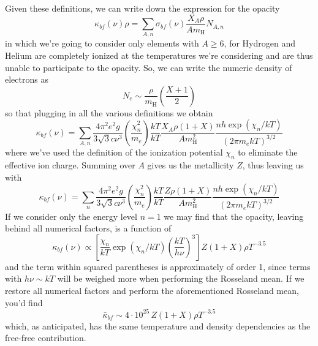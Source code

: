 Given these definitions, we can write down the expression for the opacity
\begin{equation*}
	\kappa_{bf}(\nu)\rho = \sum_{A,n}\sigma_{bf}(\nu)\frac{X_{A}\rho}{A m_{\text{H}}}N_{A,n}
\end{equation*}
in which we're going to consider only elements with $A\geq 6$, for Hydrogen and Helium are completely ionized at the temperatures we're considering and are thus unable to participate to the opacity. So, we can write the numeric density of electrons as
\begin{equation*}
	N_{e}\sim \frac{\rho}{m_{\text{H}}} \left(\frac{X+1}{2}\right)
\end{equation*}
so that plugging in all the various definitions we obtain
\begin{equation*}
	\kappa_{bf}(\nu) = \sum_{A,n} \frac{4\pi^{2}e^{2}g}{3\sqrt{3}c\nu^{3}}\left(\frac{\chi_{n}^{2}}{m_{e}}\right)\frac{kT}{kT}\frac{X_{A}\rho(1+X)}{Am_{\text{H}}^{2}}\frac{nh\exp(\chi_{n}/kT)}{(2\pi m_{e}kT)^{3/2}}
\end{equation*}
where we've used the definition of the ionization potential $\chi_{n}$ to eliminate the effective ion charge. Summing over $A$ gives us the metallicity $Z$, thus leaving us with 
\begin{equation*}
	\kappa_{bf}(\nu) = \sum_{n} \frac{4\pi^{2}e^{2}g}{3\sqrt{3}c\nu^{3}}\left(\frac{\chi_{n}^{2}}{m_{e}}\right)\frac{kT}{kT}\frac{Z\rho(1+X)}{Am_{\text{H}}^{2}}\frac{nh\exp(\chi_{n}/kT)}{(2\pi m_{e}kT)^{3/2}}
\end{equation*}
If we consider only the energy level $n=1$ we may find that the opacity, leaving behind all numerical factors, is a function of 
\begin{equation*}
	\kappa_{bf}(\nu) \propto \left[\frac{\chi_{n}}{kT}\exp\left(\chi_{n}/kT\right)\left(\frac{kT}{h\nu}\right)^{3}\right]Z(1+X)\rho T^{-3.5}
\end{equation*}
and the term within squared parentheses is approximately of order 1, since terms with $h\nu\sim kT$ will be weighed more when performing the Rosseland mean. If we restore all numerical factors and perform the aforementioned Rosseland mean, you'd find 
\begin{equation}
	\bar{\kappa}_{bf} \sim 4\cdot 10^{25}\,Z(1+X)\rho T^{-3.5}
	\label{eq:photoionizationopacity}
\end{equation}
which, as anticipated, has the same temperature and density dependencies as the free-free contribution.

